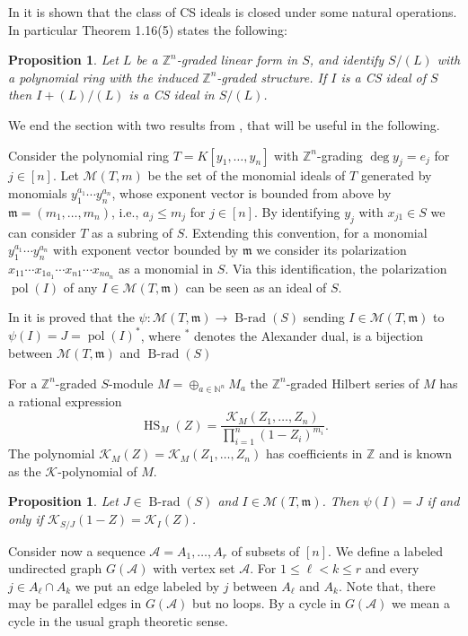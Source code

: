 \documentclass{amsart}
\newtheorem{proposition}[theorem]{Proposition}
\theoremstyle{definition}
\numberwithin{equation}{section}
\DeclareMathOperator{\Brad}{B-rad}
\def\HS{\operatorname{HS}}
\def\mm{\mathfrak{m}}
\newcommand{\M}{{\mathcal M}}
\DeclareMathOperator{\pol}{pol}
\def\to{\longrightarrow}
\def\cA{\mathcal{A}}
\def\NN{\mathbb{N}}
\def\ZZ{\mathbb{Z}}
\def\cK{\mathcal{K}}
\begin{document}
In \cite[Theorem 1.16]{CDG2} it is shown that the class of CS ideals is closed under some natural operations. In particular Theorem 1.16(5) states the following:
\begin{proposition}
\label{sections}
Let $L$ be a $\ZZ^n$-graded linear form in $S$, and identify $S/(L)$  with a polynomial ring with the induced $\ZZ^n$-graded structure.
If $I$ is a CS ideal of $S$ then $I+(L)/(L)$ is a CS ideal
in $S/(L)$.
\end{proposition}


We end the section with two results from \cite{Radical:support}, that will be useful in the following.

Consider the polynomial ring $T = K[y_1,\dots, y_n]$ with  
$\ZZ^n$-grading $\deg y_{j}=e_j$ for $j\in [n]$.  
Let $\M(T,m)$ be the set of the monomial ideals of $T$ generated by monomials $y_1^{a_1}\cdots y_n^{a_n}$, whose exponent vector is bounded from above by $\mm=(m_1,\dots,m_n)$,
i.e.,  $a_j \leq m_j$ for $j \in [n]$. 
By identifying $y_j$ with $x_{j1} \in S$  we can consider
$T$ as a subring of $S$. Extending this convention,
for a monomial $y_1^{a_1}\cdots y_n^{a_n}$ with exponent vector
bounded by $\mm$ we consider its polarization 
$x_{11}\cdots x_{1a_1} \cdots x_{n1}\cdots x_{na_n}$
as a monomial in $S$. Via this identification, the 
polarization $\pol(I)$ of any $I\in \M(T,\mm)$ can be seen as
an ideal of $S$. 

In \cite{Radical:support} it is proved that the  $\psi: \M(T,\mm) \to  \Brad(S)$ sending $I \in \M(T,\mm)$ to $\psi(I)=J=\pol(I)^*$, where 
  $^*$ denotes the Alexander dual, is a bijection between $\M(T,\mm)$ and  $\Brad(S)$

For a $\ZZ^n$-graded $S$-module $M=\oplus_{a\in \NN^n} M_a$ the $\ZZ^n$-graded Hilbert series of $M$ 
has a rational expression  
 $$\HS_M(Z)=\frac{\cK_M(Z_1,\dots,Z_n)}{\prod_{i=1}^n(1-Z_i)^{m_i}}.$$
   The polynomial $\cK_M(Z)=\cK_M(Z_1,\dots,Z_n)$ has coefficients in $\ZZ$ and is known as the $\cK$-polynomial of $M$.    

\begin{proposition}\cite[Proposition 2.4]{Radical:support}
\label{JandE} 
 Let $J\in \Brad(S)$ and $I\in \M(T,\mm)$. Then
 $\psi(I) = J$ if and only if $\cK_{S/J}(1-Z)=\cK_I(Z)$.  
\end{proposition} 
 
Consider now a sequence $\cA = A_1 , \ldots,  A_r$ of subsets of $[n]$. We define a
labeled undirected graph $G(\cA)$ with vertex set $\cA$. 
For $1 \leq \ell < k \leq r$ and every $j \in A_\ell \cap A_k$ we put 
an edge labeled by $j$ between $A_\ell$ and $A_k$. Note that, there may be parallel
edges in $G(\cA)$ but no loops.
By a cycle in $G(\cA)$ we mean a cycle in the
usual graph theoretic sense. 
\end{document}
